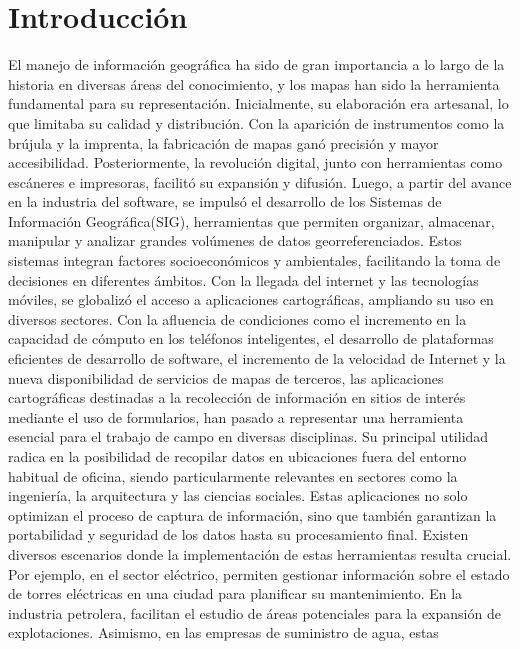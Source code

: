 \chapter{Introducción}\label{chapter:introduction}
El manejo de información geográfica ha sido de gran importancia a lo largo de la
historia en diversas áreas del conocimiento, y los mapas han sido la herramienta
fundamental para su representación. Inicialmente, su elaboración era artesanal, lo
que limitaba su calidad y distribución. Con la aparición de instrumentos como la
brújula y la imprenta, la fabricación de mapas ganó precisión y mayor accesibilidad.
Posteriormente, la revolución digital, junto con herramientas como escáneres e
impresoras, facilitó su expansión y difusión.
Luego, a partir del avance en la industria del software, se impulsó el desarrollo de
los Sistemas de Información Geográfica(SIG)\cite{SIG}, herramientas que permiten
organizar, almacenar, manipular y analizar grandes volúmenes de datos
georreferenciados. Estos sistemas integran factores socioeconómicos y
ambientales, facilitando la toma de decisiones en diferentes ámbitos. Con la llegada
del internet y las tecnologías móviles, se globalizó el acceso a aplicaciones
cartográficas, ampliando su uso en diversos sectores.
Con la afluencia de condiciones como el incremento en la capacidad de cómputo en
los teléfonos inteligentes, el desarrollo de plataformas eficientes de desarrollo de
software, el incremento de la velocidad de Internet y la nueva disponibilidad de
servicios de mapas de terceros, las aplicaciones cartográficas destinadas a la
recolección de información en sitios de interés mediante el uso de formularios, han
pasado a representar una herramienta esencial para el trabajo de campo en
diversas disciplinas. Su principal utilidad radica en la posibilidad de recopilar datos
en ubicaciones fuera del entorno habitual de oficina, siendo particularmente
relevantes en sectores como la ingeniería, la arquitectura y las ciencias sociales.
Estas aplicaciones no solo optimizan el proceso de captura de información, sino que
también garantizan la portabilidad y seguridad de los datos hasta su procesamiento
final.
Existen diversos escenarios donde la implementación de estas herramientas resulta
crucial. Por ejemplo, en el sector eléctrico, permiten gestionar información sobre el
estado de torres eléctricas en una ciudad para planificar su mantenimiento. En la
industria petrolera, facilitan el estudio de áreas potenciales para la expansión de
explotaciones. Asimismo, en las empresas de suministro de agua, estas

